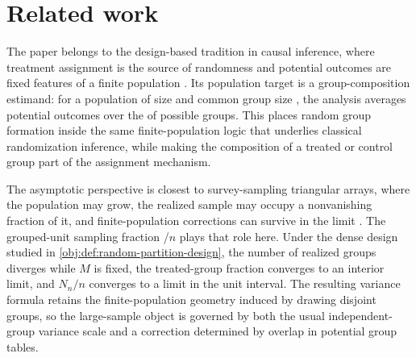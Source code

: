 \section{Related work}\label{sec:related-work}

The paper belongs to the design-based tradition in causal inference, where treatment assignment is the source of randomness and potential outcomes are fixed features of a finite population \citep{Neyman1923,Fisher1935,Cox1958,Rubin1974,Holland1986}. Its population target is a group-composition estimand: for a population of size  and common group size , the analysis averages potential outcomes over the  of possible groups. This places random group formation inside the same finite-population logic that underlies classical randomization inference, while making the composition of a treated or control group part of the assignment mechanism.

The asymptotic perspective is closest to survey-sampling triangular arrays, where the population may grow, the realized sample may occupy a nonvanishing fraction of it, and finite-population corrections can survive in the limit \citep{Hajek1960,Cochran1977,Ohlsson1989,Fuller2009}. The grouped-unit sampling fraction /\(n\) plays that role here. Under the dense design studied in \cref{obj:def:random-partition-design}, the number of realized groups  diverges while \(M\) is fixed, the treated-group fraction  converges to an interior limit, and \(N_n/n\) converges to a limit  in the unit interval. The resulting variance formula retains the finite-population geometry induced by drawing disjoint groups, so the large-sample object is governed by both the usual independent-group variance scale and a correction determined by overlap in potential group tables.

